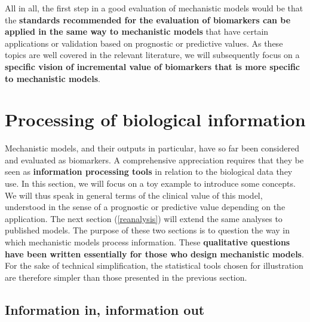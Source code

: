 \documentclass[a4paper,12pt,twoside,onecolumn,openright,final,oldfontcommands]{memoir}
\begin{document}
All in all, the first step in a good evaluation of mechanistic models
would be that the \textbf{standards recommended for the evaluation of
biomarkers can be applied in the same way to mechanistic models} that
have certain applications or validation based on prognostic or
predictive values. As these topics are well covered in the relevant
literature, we will subsequently focus on a \textbf{specific vision of
incremental value of biomarkers that is more specific to mechanistic
models}.

\section{Processing of biological
information}\label{processing-of-biological-information}

Mechanistic models, and their outputs in particular, have so far been
considered and evaluated as biomarkers. A comprehensive appreciation
requires that they be seen as \textbf{information processing tools} in
relation to the biological data they use. In this section, we will focus
on a toy example to introduce some concepts. We will thus speak in
general terms of the clinical value of this model, understood in the
sense of a prognostic or predictive value depending on the application.
The next section (\ref{reanalysis}) will extend the same analyses to
published models. The purpose of these two sections is to question the
way in which mechanistic models process information. These
\textbf{qualitative questions have been written essentially for those
who design mechanistic models}. For the sake of technical
simplification, the statistical tools chosen for illustration are
therefore simpler than those presented in the previous section.

\subsection{Information in, information out}\label{information}
\end{document}
